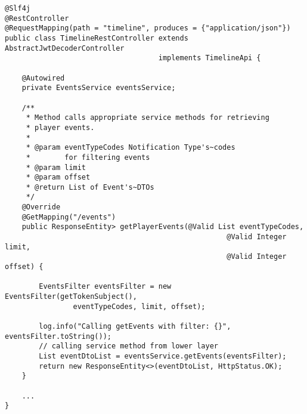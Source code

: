 \documentclass[12pt]{article}
\begin{document}
\begin{lstlisting}
@Slf4j
@RestController
@RequestMapping(path = "timeline", produces = {"application/json"})
public class TimelineRestController extends AbstractJwtDecoderController
                                    implements TimelineApi {

    @Autowired
    private EventsService eventsService;

    /**
     * Method calls appropriate service methods for retrieving
     * player events.
     *
     * @param eventTypeCodes Notification Type's~codes
     *        for filtering events
     * @param limit
     * @param offset
     * @return List of Event's~DTOs
     */
    @Override
    @GetMapping("/events")
    public ResponseEntity> getPlayerEvents(@Valid List eventTypeCodes,
                                                    @Valid Integer limit,
                                                    @Valid Integer offset) {

        EventsFilter eventsFilter = new EventsFilter(getTokenSubject(),
                eventTypeCodes, limit, offset);

        log.info("Calling getEvents with filter: {}", eventsFilter.toString());
        // calling service method from lower layer
        List eventDtoList = eventsService.getEvents(eventsFilter);
        return new ResponseEntity<>(eventDtoList, HttpStatus.OK);
    }
    
    ...
}
\end{lstlisting}



\end{document}
